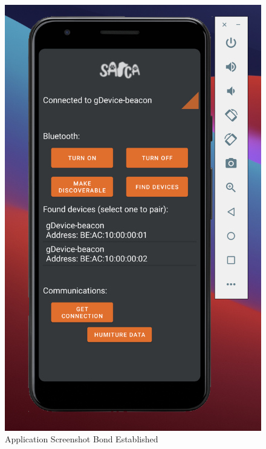 \documentclass{ueacmpstyle}
\begin{document}
            \begin{figure}[h]
                \centering
                \includegraphics[scale=0.75]{Images/App_photo_2.png}
                \caption{Application Screenshot Bond Established}
                \label{Figure App Bonded}
            
            \end{figure}
            \clearpage
            
\end{document}

